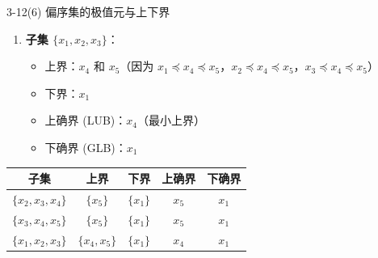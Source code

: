 \documentclass[11pt]{article}
\begin{document}
\begin{question}{3-12(6) 偏序集的极值元与上下界}
\begin{answer}
\begin{enumerate}
      \item \textbf{子集 $\{x_1, x_2, x_3\}$}：
        \begin{itemize}
          \item 上界：$x_4$ 和 $x_5$（因为 $x_1 \preceq x_4 \preceq x_5$，$x_2 \preceq x_4 \preceq x_5$，$x_3 \preceq x_4 \preceq x_5$）
          \item 下界：$x_1$
          \item 上确界 (LUB)：$x_4$（最小上界）
          \item 下确界 (GLB)：$x_1$
        \end{itemize}
    \end{enumerate}

    \begin{info}[总结:]
      \begin{tabular}{c|c|c|c|c}
        子集 & 上界 & 下界 & 上确界 & 下确界 \\ \hline
        $\{x_2, x_3, x_4\}$ & $\{x_5\}$ & $\{x_1\}$ & $x_5$ & $x_1$ \\
        $\{x_3, x_4, x_5\}$ & $\{x_5\}$ & $\{x_1\}$ & $x_5$ & $x_1$ \\
        $\{x_1, x_2, x_3\}$ & $\{x_4, x_5\}$ & $\{x_1\}$ & $x_4$ & $x_1$
      \end{tabular}
    \end{info}
  \end{answer}
\end{question}
\end{document}
